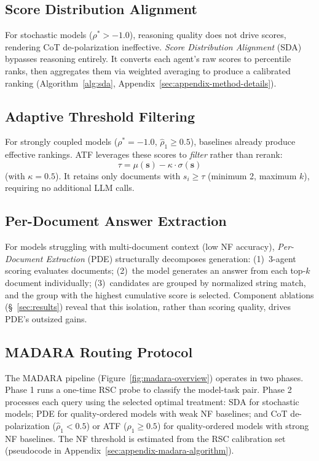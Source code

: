 \documentclass[11pt]{article}
\theoremstyle{definition}
\begin{document}
\subsection{Score Distribution Alignment}
\label{subsec:sda}

For stochastic models (\(\rho^* > -1.0\)), reasoning quality does not drive scores, rendering CoT de-polarization ineffective. \emph{Score Distribution Alignment} (SDA) bypasses reasoning entirely. It converts each agent's raw scores to percentile ranks, then aggregates them via weighted averaging to produce a calibrated ranking (Algorithm~\ref{alg:sda}, Appendix~\ref{sec:appendix-method-details}).

\subsection{Adaptive Threshold Filtering}
\label{subsec:aga-thresh}

For strongly coupled models (\(\rho^* = -1.0\), \(\hat{\rho}_1 \geq 0.5\)), baselines already produce effective rankings. ATF leverages these scores to \emph{filter} rather than rerank:
\begin{equation}
  \tau = \mu(\mathbf{s}) - \kappa \cdot \sigma(\mathbf{s})
\end{equation}
(with \(\kappa = 0.5\)). It retains only documents with \(s_i \geq \tau\) (minimum 2, maximum \(k\)), requiring no additional LLM calls.

\subsection{Per-Document Answer Extraction}
\label{subsec:aga-perdoc}

For models struggling with multi-document context (low NF accuracy), \emph{Per-Document Extraction} (PDE) structurally decomposes generation: (1)~3-agent scoring evaluates documents; (2)~the model generates an answer from each top-\(k\) document individually; (3)~candidates are grouped by normalized string match, and the group with the highest cumulative score is selected. Component ablations (\S~\ref{sec:results}) reveal that this isolation, rather than scoring quality, drives PDE's outsized gains.

\subsection{MADARA Routing Protocol}
\label{subsec:madara-pipeline}

The MADARA pipeline (Figure~\ref{fig:madara-overview}) operates in two phases. Phase 1 runs a one-time RSC probe to classify the model-task pair. Phase 2 processes each query using the selected optimal treatment: SDA for stochastic models; PDE for quality-ordered models with weak NF baselines; and CoT de-polarization (\(\hat{\rho}_1 < 0.5\)) or ATF (\(\hat{\rho}_1 \geq 0.5\)) for quality-ordered models with strong NF baselines. The NF threshold is estimated from the RSC calibration set (pseudocode in Appendix~\ref{sec:appendix-madara-algorithm}).
\end{document}
